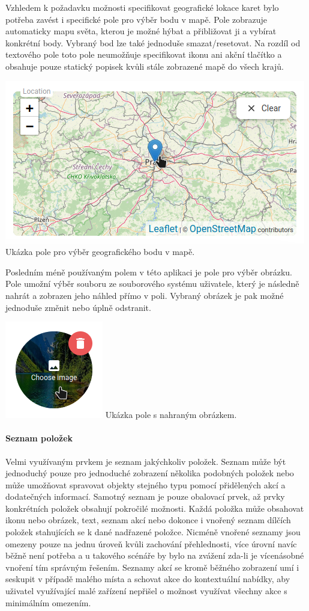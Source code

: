 			Vzhledem k požadavku možnosti specifikovat geografické lokace karet bylo potřeba zavést i specifické pole
			pro výběr bodu v mapě.
			Pole zobrazuje automaticky mapu světa, kterou je možné hýbat a přibližovat ji a vybírat konkrétní body.
			Vybraný bod lze také jednoduše smazat/resetovat.
			Na rozdíl od textového pole toto pole neumožňuje specifikovat ikonu ani akční tlačítko a obsahuje pouze
			statický popisek kvůli stále zobrazené mapě do všech krajů.

			\includegraphics[width=0.24\linewidth]{obrazky/pole_lokace}\hfill
			Ukázka pole pro výběr geografického bodu v mapě. %

			Posledním méně používaným polem v této aplikaci je pole pro výběr obrázku.
			Pole umožní výběr souboru ze souborového systému uživatele, který je následně nahrát a zobrazen jeho náhled
			přímo v poli.
			Vybraný obrázek je pak možné jednoduše změnit nebo úplně odstranit.

			\includegraphics[width=0.24\linewidth]{obrazky/obrazkove_pole}\hfill
			Ukázka pole s nahraným obrázkem. %

			\paragraph{Seznam položek}

			Velmi využívaným prvkem je seznam jakýchkoliv položek.
			Seznam může být jednoduchý pouze pro jednoduché zobrazení několika podobných položek nebo může umožňovat
			spravovat objekty stejného typu pomocí přidělených akcí a dodatečných informací.
			Samotný seznam je pouze obalovací prvek, až prvky konkrétních položek obsahují pokročilé možnosti.
			Každá položka může obsahovat ikonu nebo obrázek, text, seznam akcí nebo dokonce i vnořený seznam dílčích
			položek stahujících se k dané nadřazené položce.
			Nicméně vnořené seznamy jsou omezeny pouze na jednu úroveň kvůli zachování přehlednosti, více úrovní navíc
			běžně není potřeba a u takového scénáře by bylo na zvážení zda-li je vícenásobné vnoření tím správným řešením.
			Seznamy akcí se kromě běžného zobrazení umí i seskupit v případě malého místa a schovat akce do kontextuální
			nabídky, aby uživatel využívající malé zařízení nepřišel o možnost využívat všechny akce s minimálním omezením.

